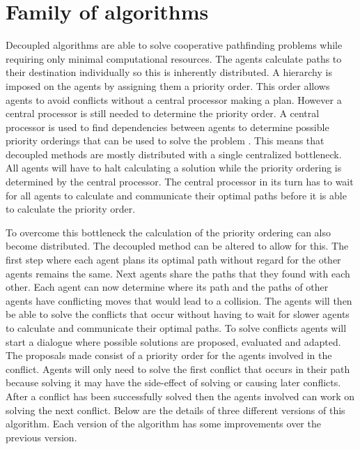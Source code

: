 \section{Family of algorithms}\label{sec:method}
Decoupled algorithms are able to solve cooperative pathfinding problems while
requiring only minimal computational resources. The agents calculate paths to
their destination individually so this is inherently distributed. A hierarchy
is imposed on the agents by assigning them a priority order. This order allows
agents to avoid conflicts without a central processor making a plan. However a
central processor is still needed to determine the priority order. A central
processor is used to
find dependencies between agents to determine possible priority orderings that
can be used to solve the problem \cite{latombe1991,bennewitz2002}. This means
that decoupled methods are mostly distributed with a single centralized
bottleneck. All agents will have to halt calculating a solution while the
priority ordering is determined by the central processor. The central processor
in its turn has to wait for all agents to calculate and communicate their
optimal paths before it is able to calculate the priority order.

To overcome this bottleneck the calculation of the priority ordering can also
become distributed. The decoupled method can be
altered to allow for this. The first step where each agent plans its optimal
path without regard for the other agents remains the same. Next agents share
the paths that they found with each other. Each agent can now determine where
its path and the paths of other agents have conflicting moves that would lead 
to a collision. The agents will then be able to solve the conflicts that occur 
without having to wait for slower agents to
calculate and communicate their optimal paths. To solve conflicts agents will
start a dialogue where possible solutions are proposed, evaluated and adapted.
The proposals made consist of a priority order for the agents involved in the
conflict. Agents will only need to solve the first conflict that occurs in
their path because solving it may have the side-effect of solving or causing 
later
conflicts. After a conflict has been successfully solved then the agents
involved can work on solving the next conflict.
Below are the details of three different versions of this algorithm. Each
version of the algorithm has some improvements over the previous version.

